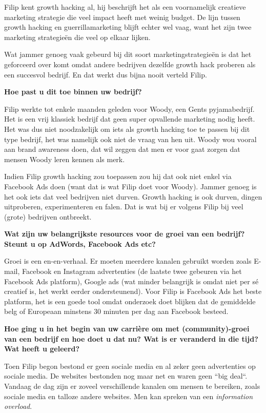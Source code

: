 Filip kent growth hacking al, hij beschrijft het als een voornamelijk creatieve marketing strategie die veel impact heeft met weinig budget. De lijn tussen growth hacking en guerrillamarketing blijft echter wel vaag, want het zijn twee marketing strategieën die veel op elkaar lijken. 

Wat jammer genoeg vaak gebeurd bij dit soort marketingstrategieën is dat het geforceerd over komt omdat andere bedrijven dezelfde growth hack proberen als een succesvol bedrijf. En dat werkt dus bijna nooit verteld Filip.

\textbf{Hoe past u dit toe binnen uw bedrijf?}
	
Filip werkte tot enkele maanden geleden voor Woody, een Gents pyjamabedrijf. Het is een vrij klassiek bedrijf dat geen super opvallende marketing nodig heeft. Het was dus niet noodzakelijk om iets als growth hacking toe te passen bij dit type bedrijf, het was namelijk ook niet de vraag van hen uit. Woody wou vooral aan brand awareness doen, dat wil zeggen dat men er voor gaat zorgen dat mensen Woody leren kennen als merk. 

Indien Filip growth hacking zou toepassen zou hij dat ook niet enkel via Facebook Ads doen (want dat is wat Filip doet voor Woody). Jammer genoeg is het ook iets dat veel bedrijven niet durven. Growth hacking is ook durven, dingen uitproberen, experimenteren en falen. Dat is wat bij er volgens Filip bij veel (grote) bedrijven ontbreekt.
	
\textbf{Wat zijn uw belangrijkste resources voor de groei van een bedrijf? Steunt u op AdWords, Facebook Ads etc?}
	
Groei is een en-en-verhaal. Er moeten meerdere kanalen gebruikt worden zoals E-mail, Facebook en Instagram advertenties (de laatste twee gebeuren via het Facebook Ads platform), Google ads (wat minder belangrijk is omdat niet per sé creatief is, het werkt eerder ondersteunend). Voor Filip is Facebook Ads het beste platform, het is een goede tool omdat onderzoek doet blijken dat de gemiddelde belg of Europeaan minstens 30 minuten per dag aan Facebook besteed.

\textbf{Hoe ging u in het begin van uw carrière om met (community)-groei van een bedrijf en hoe doet u dat nu? Wat is er veranderd in die tijd? Wat heeft u geleerd?}
	
Toen Filip begon bestond er geen sociale media en al zeker geen advertenties op sociale media. De websites bestonden nog maar net en waren geen ``big deal``. 
Vandaag de dag zijn er zoveel verschillende kanalen om mensen te bereiken, zoals sociale media en talloze andere websites. Men kan spreken van een \emph{information overload}. 

